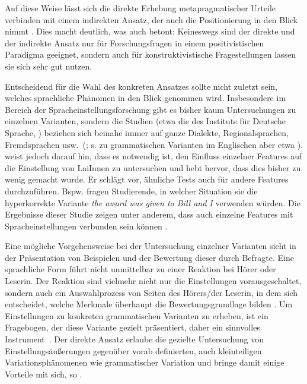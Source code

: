 Auf diese Weise lässt sich die direkte Erhebung metapragmatischer Urteile verbinden mit einem indirekten Ansatz, der auch die Positionierung in den Blick nimmt \citep[s.][110]{Liebscher.2014}. 
Dies macht deutlich, was auch \citet[145]{Soukup.2014} betont:
Keineswegs sind der direkte und der indirekte Ansatz nur für Forschungsfragen in einem positivistischen Paradigma geeignet, sondern auch für konstruktivistische Fragestellungen lassen sie sich sehr gut nutzen. 

Entscheidend für die Wahl des konkreten Ansatzes sollte nicht zuletzt sein, welches sprachliche Phänomen in den Blick genommen wird. 
Insbesondere im Bereich der Spracheinstellungsforschung gibt es bisher kaum Untersuchungen zu einzelnen Varianten, sondern die Studien (etwa die des Instituts für Deutsche Sprache, \citealp[s.][]{Adler.2018}) beziehen sich beinahe immer auf ganze Dialekte, Regionalsprachen, Fremdsprachen usw.~(\citealp[s.][1251]{Garrett2005}; s. zu grammatischen Varianten im Englischen aber etwa \citealp{Ebner.2018}).
\citet[39--40]{Preston2004} weist jedoch darauf hin, dass es notwendig ist, den Einfluss einzelner Features auf die Einstellung von LaiInnen zu untersuchen und hebt hervor, dass dies bisher zu wenig gemacht wurde. 
Er schl{\"a}gt vor, {\"a}hnliche Tests auch f{\"u}r andere Features durchzuf{\"u}hren. Bspw. fragen \citet{AlBanyan.1998} Studierende, in welcher Situation sie die hyperkorrekte Variante  \textit{the award was given to Bill and I }verwenden w{\"u}rden. 
Die Ergebnisse dieser Studie zeigen unter anderem, dass auch einzelne Features mit Spracheinstellungen verbunden sein k{\"o}nnen \citep[s.][44]{Preston2004}.

Eine m{\"o}gliche Vorgehensweise bei der Untersuchung einzelner Varianten sieht \citet[1693]{Preston2005} in der Pr{\"a}sentation von Beispielen und der Bewertung dieser durch Befragte.
Eine sprachliche Form f{\"u}hrt nicht unmittelbar zu einer Reaktion bei H{\"o}rer oder Leserin. 
Der Reaktion sind vielmehr nicht nur die Einstellungen vorausgeschaltet, sondern auch ein Auswahlprozess von Seiten des H{\"o}rers/der Leserin, in dem sich entscheidet, welche Merkmale {\"u}berhaupt die Bewertungsgrundlage bilden \citep[s.][218]{Cargile.1994}. 
Um Einstellungen zu konkreten grammatischen Varianten zu erheben, ist ein Fragebogen, der diese Variante gezielt pr{\"a}sentiert, daher ein sinnvolles Instrument~\citep[s.][218]{Cargile.1994}. 
Der direkte Ansatz erlaube die gezielte Untersuchung von %
Einstellungsäußerungen %
gegen{\"u}ber vorab definierten, auch kleinteiligen Variationsph{\"a}nomenen wie grammatischer Variation und bringe damit einige Vorteile mit sich, so \citet[213]{Cargile.1994}.

